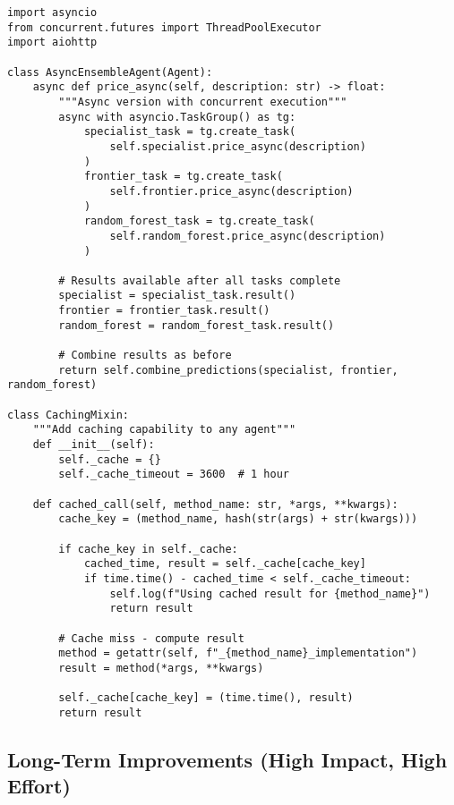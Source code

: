 \begin{lstlisting}[caption=Parallel Processing Enhancement]
import asyncio
from concurrent.futures import ThreadPoolExecutor
import aiohttp

class AsyncEnsembleAgent(Agent):
    async def price_async(self, description: str) -> float:
        """Async version with concurrent execution"""
        async with asyncio.TaskGroup() as tg:
            specialist_task = tg.create_task(
                self.specialist.price_async(description)
            )
            frontier_task = tg.create_task(
                self.frontier.price_async(description)
            )
            random_forest_task = tg.create_task(
                self.random_forest.price_async(description)
            )
        
        # Results available after all tasks complete
        specialist = specialist_task.result()
        frontier = frontier_task.result()
        random_forest = random_forest_task.result()
        
        # Combine results as before
        return self.combine_predictions(specialist, frontier, random_forest)

class CachingMixin:
    """Add caching capability to any agent"""
    def __init__(self):
        self._cache = {}
        self._cache_timeout = 3600  # 1 hour
    
    def cached_call(self, method_name: str, *args, **kwargs):
        cache_key = (method_name, hash(str(args) + str(kwargs)))
        
        if cache_key in self._cache:
            cached_time, result = self._cache[cache_key]
            if time.time() - cached_time < self._cache_timeout:
                self.log(f"Using cached result for {method_name}")
                return result
        
        # Cache miss - compute result
        method = getattr(self, f"_{method_name}_implementation")
        result = method(*args, **kwargs)
        
        self._cache[cache_key] = (time.time(), result)
        return result
\end{lstlisting}

\subsection{Long-Term Improvements (High Impact, High Effort)}

